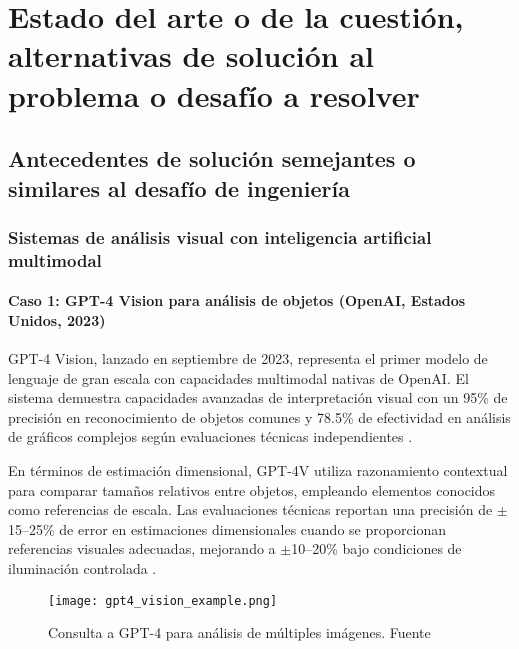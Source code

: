 
\chapter{Estado del arte o de la cuestión, alternativas de solución al problema o desafío a resolver}

\section{Antecedentes de solución semejantes o similares al desafío de ingeniería}

\subsection{Sistemas de análisis visual con inteligencia artificial multimodal}

\subsubsection{Caso 1: GPT-4 Vision para análisis de objetos (OpenAI, Estados Unidos, 2023)}

GPT-4 Vision, lanzado en septiembre de 2023, representa el primer modelo de lenguaje de gran escala con capacidades multimodal nativas de OpenAI. El sistema demuestra capacidades avanzadas de interpretación visual con un 95\% de precisión en reconocimiento de objetos comunes y 78.5\% de efectividad en análisis de gráficos complejos según evaluaciones técnicas independientes \cite{ArticleRef255136}.

En términos de estimación dimensional, GPT-4V utiliza razonamiento contextual para comparar tamaños relativos entre objetos, empleando elementos conocidos como referencias de escala. Las evaluaciones técnicas reportan una precisión de $\pm$15--25\% de error en estimaciones dimensionales cuando se proporcionan referencias visuales adecuadas, mejorando a $\pm$10--20\% bajo condiciones de iluminación controlada \cite{Yu2024}.

\begin{figure}[H]
    \centering
    \texttt{[image: gpt4\_vision\_example.png]}
    \caption{Consulta a GPT-4 para análisis de múltiples imágenes. Fuente \cite{ArticleRef255134}}
    \label{fig:gpt4_vision}
\end{figure}

